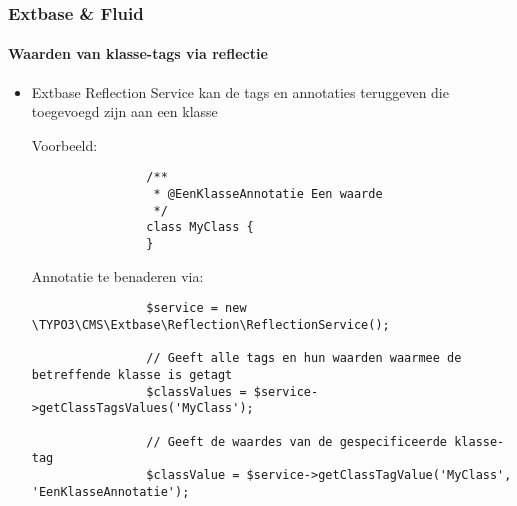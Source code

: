\begin{frame}[fragile]
	\frametitle{Extbase \& Fluid}
	\framesubtitle{Waarden van klasse-tags via reflectie}

	\lstset{
		basicstyle=\tiny\ttfamily
	}

	\begin{itemize}
		\item Extbase Reflection Service kan de tags en annotaties teruggeven die toegevoegd zijn aan een klasse\newline

			Voorbeeld:
			\begin{lstlisting}
				/**
				 * @EenKlasseAnnotatie Een waarde
				 */
				class MyClass {
				}
			\end{lstlisting}

			Annotatie te benaderen via:
			\begin{lstlisting}
				$service = new \TYPO3\CMS\Extbase\Reflection\ReflectionService();

				// Geeft alle tags en hun waarden waarmee de betreffende klasse is getagt
				$classValues = $service->getClassTagsValues('MyClass');

				// Geeft de waardes van de gespecificeerde klasse-tag
				$classValue = $service->getClassTagValue('MyClass', 'EenKlasseAnnotatie');
			\end{lstlisting}

	\end{itemize}

\end{frame}

